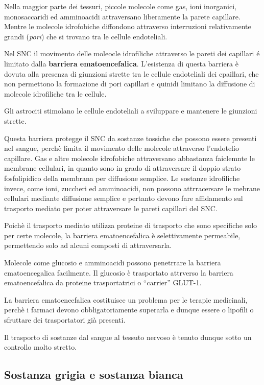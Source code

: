 \documentclass[]{article}
\begin{document}
Nella maggior parte dei tessuri, piccole molecole come gas, ioni
inorganici, monosaccaridi ed amminoacidi attraversano liberamente la
parete capillare. Mentre le molecole idrofobiche diffondono attraverso
interruzioni relativamente grandi (\emph{pori}) che si trovano tra le
cellule endoteliali.

Nel SNC il movimento delle moleocle idrofiliche attraverso le pareti dei
capillari é limitato dalla \textbf{barriera ematoencefalica}.
L'esistenza di questa barriera è dovuta alla presenza di giunzioni
strette tra le cellule endoteliali dei cpaillari, che non permettono la
formazione di pori capillari e quinidi limitano la diffusione di
molecole idrofiliche tra le cellule.

Gli astrociti stimolano le cellule endoteliali a sviluppare e mantenere
le giunzioni strette.

Questa barriera protegge il SNC da sostanze tossiche che possono essere
presenti nel sangue, perchè limita il movimento delle molecole
attraverso l'endotelio capillare. Gas e altre molecole idrofobiche
attraversano abbastanza faiclemnte le membrane cellulari, in quanto sono
in grado di attraversare il doppio strato fosfolipidico della membrana
per diffusione semplice. Le sostanze idrofiliche invece, come ioni,
zuccheri ed amminoacidi, non possono attrracersare le mebrane cellulari
mediante diffusione semplice e pertanto devono fare affidamento sul
trasporto mediato per poter attraversare le pareti capillari del SNC.

Poichè il trasporto mediato utilizza proteine di trasporto che sono
specifiche solo per certe molecole, la barriera ematoencefalica è
selettivamente permeabile, permettendo solo ad alcuni composti di
attraversarla.

Molecole come glucosio e amminoacidi possono penetrrare la barriera
ematoencegalica facilmente. Il glucosio è trasportato attrverso la
barriera ematoencefalica da proteine trasportatrici o ``carrier''
GLUT-1.

La barriera ematoencefalica costituisce un problema per le terapie
medicinali, perchè i farmaci devono obbligatoriamente superarla e dunque
essere o lipofili o sfruttare dei trasportatori già presenti.

Il trasporto di sostanze dal sangue al tessuto nervoso è tenuto dunque
sotto un controllo molto stretto.

\subsection{Sostanza grigia e sostanza
bianca}\label{sostanza-grigia-e-sostanza-bianca}
\end{document}
